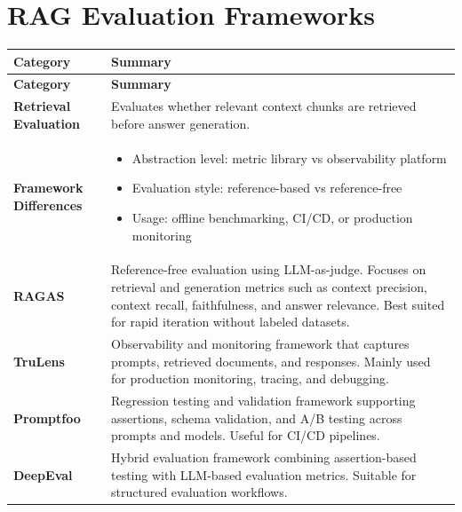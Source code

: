 \documentclass[10pt,a4paper]{article}
\begin{document}
\newpage
\section{RAG Evaluation Frameworks}
\begin{longtable}{|p{}|p{}|}

\hline
\textbf{Category} & \textbf{Summary} \\
\hline
\endfirsthead

\hline
\textbf{Category} & \textbf{Summary} \\
\hline
\endhead

\hline
\endfoot

\hline
\endlastfoot
\hline

\textbf{Retrieval Evaluation} &
Evaluates whether relevant context chunks are retrieved before answer generation.
\\
\hline

\textbf{Framework Differences} &
\begin{itemize}
    \item Abstraction level: metric library vs observability platform
    \item Evaluation style: reference-based vs reference-free
    \item Usage: offline benchmarking, CI/CD, or production monitoring
\end{itemize}
\\
\hline

\textbf{RAGAS} &
Reference-free evaluation using LLM-as-judge. Focuses on retrieval and generation metrics such as context precision, context recall, faithfulness, and answer relevance. Best suited for rapid iteration without labeled datasets.
\\
\hline

\textbf{TruLens} &
Observability and monitoring framework that captures prompts, retrieved documents, and responses. Mainly used for production monitoring, tracing, and debugging.
\\
\hline

\textbf{Promptfoo} &
Regression testing and validation framework supporting assertions, schema validation, and A/B testing across prompts and models. Useful for CI/CD pipelines.
\\
\hline

\textbf{DeepEval} &
Hybrid evaluation framework combining assertion-based testing with LLM-based evaluation metrics. Suitable for structured evaluation workflows.
\\
\hline


\end{longtable}
\end{document}
